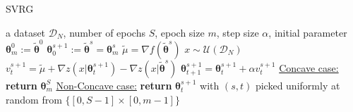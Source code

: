 \documentclass{article}
\theoremstyle{remark}
\theoremstyle{definition}
\newcommand{\vtheta}{\boldsymbol{\theta}}
\newcommand{\wt}[1]{\widetilde{#1}}
\begin{document}
\begin{algorithm}[tb]
	\caption{SVRG}
	\label{alg:svrg}
	\begin{algorithmic}
             a dataset $\mathcal{D}_N$, number of epochs $S$, epoch size $m$, step size $\alpha$, initial parameter $\vtheta_{m}^0:=\wt{\vtheta}^0$
        \STATE $\vtheta_0^{s+1} := \wt{\vtheta}^{s} = \vtheta_{m}^s$
        \STATE $\wt{\mu} = \nabla f(\wt{\vtheta}^s)$
        \STATE $x \sim \mathcal{U}\left(\mathcal{D}_N\right)$
		\STATE $v^{s+1}_t = 
			\wt{\mu} + 
			\nabla z(x|\vtheta_t^{s+1}) -
			\nabla z(x|\wt{\vtheta}^{s})
		$
        \STATE $\vtheta_{t+1}^{s+1} = \vtheta_t^{s+1} + \alpha v^{s+1}_t$
		\ENDFOR
		\ENDFOR
        \STATE \underline{Concave case:} \textbf{return} $\vtheta_{m}^S$
        \STATE \underline{Non-Concave case:} \textbf{return} $\vtheta_t^{s+1}$ with $(s,t)$ picked uniformly at random from $\{[0,S-1]\times[0,m-1]\}$
	\end{algorithmic}
\end{algorithm}
\end{document}
